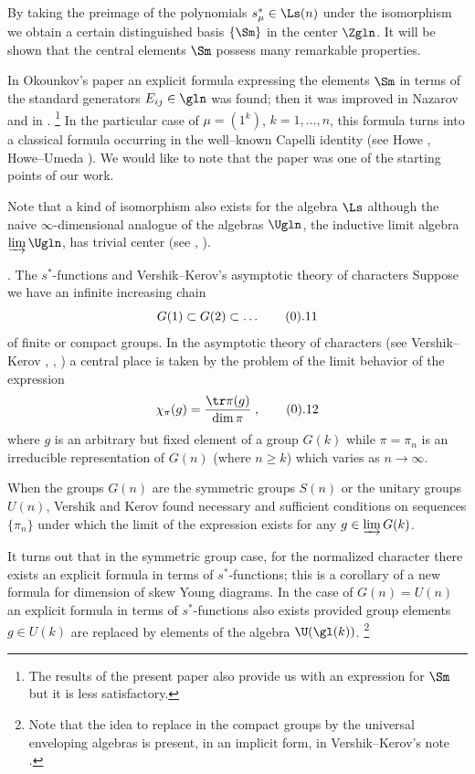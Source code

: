 By taking the preimage of the polynomials $s^*_\mu\in\Ls(n)$ under the
isomorphism  we obtain a certain distinguished basis $\{\Sm\}$ in
the center $\Zgln$. It will be shown that the central elements $\Sm$
possess many remarkable properties.

In Okounkov's paper \cite{Ok1} an explicit formula
expressing the elements $\Sm$ in terms of the standard generators
$E_{ij}\in\gln$ was found; then it was improved in Nazarov \cite {N2} and
in \cite{Ok2}. 
\footnote{ The results of the present paper also provide us with an
expression for $\Sm$ but it is less satisfactory.} In the particular case
of $\mu=(1^k)$, $k=1,\ldots,n$, this formula turns into a classical
formula occurring in the well--known Capelli identity (see 
Howe \cite{H}, Howe--Umeda \cite{HU}). We would like to note that the paper
\cite{HU} was one of the starting points of our work.

Note that a kind of isomorphism  also exists for the algebra
$\Ls$ although the naive $\infty$-dimensional analogue of the algebras
$\Ugln$, the inductive limit algebra $\varinjlim\Ugln$, has trivial center
(see \cite{O1}, \cite{O2}).

. The $s^*$-functions and Vershik--Kerov's asymptotic theory of
characters \endsubhead
Suppose we have an infinite increasing chain
$$
G(1)\subset G(2)\subset \ldots \tag0.11
$$
of finite or compact groups. In the asymptotic theory of characters (see
Vershik--Kerov \cite{VK1}, \cite{VK2}, \cite{VK3}) a central place is
taken by the problem of the limit behavior of the expression
$$
\chi_\pi(g)=\frac{\tr\pi(g)}{\dim\pi}\;,\tag0.12
$$
where $g$ is an arbitrary but fixed element of a group $G(k)$ while
$\pi=\pi_n$ is an irreducible representation of $G(n)$ (where $n\ge k$)
which varies as $n\to\infty$.

When the groups $G(n)$ are the symmetric groups $S(n)$ or the unitary
groups $U(n)$, Vershik and Kerov found necessary and sufficient conditions
on sequences 
$\{\pi_n\}$ under which the limit of the expression  exists for
any $g\in\varinjlim G(k)$. 

It turns out that in the symmetric group case, for the normalized
character  there exists an explicit formula in terms of
$s^*$-functions; this is a corollary of a new formula for dimension of
skew Young diagrams. In the case of $G(n)=U(n)$ an explicit formula in
terms of $s^*$-functions also exists provided group elements $g\in U(k)$
are replaced by elements of the algebra $\U(\gl(k))$. 
\footnote{Note that the idea 
to replace in  the compact groups by the universal
enveloping algebras is present, in an implicit form, in Vershik--Kerov's note
\cite{VK2}.} 


